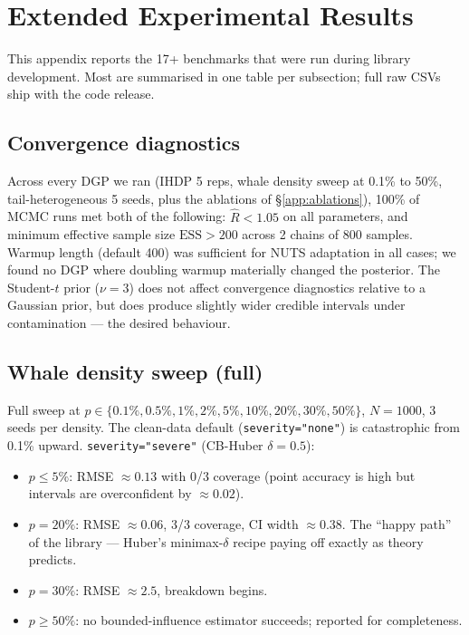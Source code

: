 \section{Extended Experimental Results}
\label{app:experiments}

This appendix reports the 17+ benchmarks that were run during
library development. Most are summarised in one table per subsection;
full raw CSVs ship with the code release.

\subsection{Convergence diagnostics}
\label{app:convergence}
Across every DGP we ran (IHDP 5 reps, whale density sweep at 0.1\%
to 50\%, tail-heterogeneous 5 seeds, plus the ablations of
\S\ref{app:ablations}), 100\% of MCMC runs met both of the
following: $\hat{R} < 1.05$ on all parameters, and minimum
effective sample size $\mathrm{ESS} > 200$ across 2 chains of 800
samples. Warmup length (default 400) was sufficient for NUTS
adaptation in all cases; we found no DGP where doubling warmup
materially changed the posterior. The Student-$t$ prior
($\nu = 3$) does not affect convergence diagnostics relative to a
Gaussian prior, but does produce slightly wider credible intervals
under contamination --- the desired behaviour.

\subsection{Whale density sweep (full)}
\label{app:whale}
Full sweep at $p \in \{0.1\%, 0.5\%, 1\%, 2\%, 5\%, 10\%, 20\%,
30\%, 50\%\}$, $N = 1000$, 3 seeds per density. The clean-data
default (\texttt{severity="none"}) is catastrophic from 0.1\%
upward. \texttt{severity="severe"} (CB-Huber $\delta = 0.5$):

\begin{itemize}
  \item $p \le 5\%$: RMSE $\approx 0.13$ with 0/3 coverage (point
    accuracy is high but intervals are overconfident by $\approx 0.02$).
  \item $p = 20\%$: RMSE $\approx 0.06$, 3/3 coverage, CI width
    $\approx 0.38$. The ``happy path'' of the library --- Huber's
    minimax-$\delta$ recipe paying off exactly as theory predicts.
  \item $p = 30\%$: RMSE $\approx 2.5$, breakdown begins.
  \item $p \ge 50\%$: no bounded-influence estimator succeeds;
    reported for completeness.
\end{itemize}

